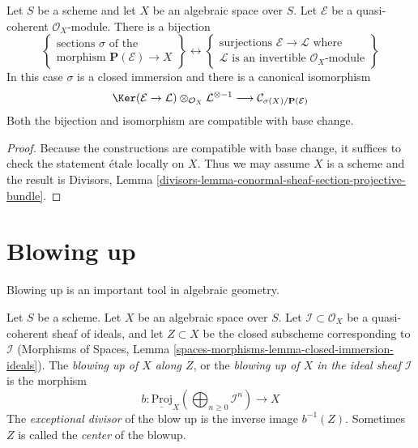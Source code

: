 \begin{lemma}
\label{lemma-conormal-sheaf-section-projective-bundle}
Let $S$ be a scheme and let $X$ be an algebraic space over $S$.
Let $\mathcal{E}$ be a quasi-coherent $\mathcal{O}_X$-module.
There is a bijection
$$
\left\{
\begin{matrix}
\text{sections }\sigma\text{ of the } \\
\text{morphism } \mathbf{P}(\mathcal{E}) \to X
\end{matrix}
\right\}
\leftrightarrow
\left\{
\begin{matrix}
\text{surjections }\mathcal{E} \to \mathcal{L}\text{ where} \\
\mathcal{L}\text{ is an invertible }\mathcal{O}_X\text{-module}
\end{matrix}
\right\}
$$
In this case $\sigma$ is a closed immersion and there is a canonical
isomorphism
$$
\Ker(\mathcal{E} \to \mathcal{L})
\otimes_{\mathcal{O}_X} \mathcal{L}^{\otimes -1}
\longrightarrow
\mathcal{C}_{\sigma(X)/\mathbf{P}(\mathcal{E})}
$$
Both the bijection and isomorphism are compatible with base change.
\end{lemma}

\begin{proof}
Because the constructions are compatible with base change, it suffices to
check the statement \'etale locally on $X$. Thus we may assume $X$ is
a scheme and the result is
Divisors, Lemma \ref{divisors-lemma-conormal-sheaf-section-projective-bundle}.
\end{proof}






\section{Blowing up}
\label{section-blowing-up}

\noindent
Blowing up is an important tool in algebraic geometry.

\begin{definition}
\label{definition-blow-up}
Let $S$ be a scheme. Let $X$ be an algebraic space over $S$.
Let $\mathcal{I} \subset \mathcal{O}_X$ be a quasi-coherent sheaf
of ideals, and let $Z \subset X$ be the closed subscheme corresponding
to $\mathcal{I}$
(Morphisms of Spaces, Lemma
\ref{spaces-morphisms-lemma-closed-immersion-ideals}).
The {\it blowing up of $X$ along $Z$}, or the
{\it blowing up of $X$ in the ideal sheaf $\mathcal{I}$} is
the morphism
$$
b :
\underline{\text{Proj}}_X
\left(\bigoplus\nolimits_{n \geq 0} \mathcal{I}^n\right)
\longrightarrow
X
$$
The {\it exceptional divisor} of the blow up is the inverse image
$b^{-1}(Z)$. Sometimes $Z$ is called the {\it center} of the blowup.
\end{definition}

